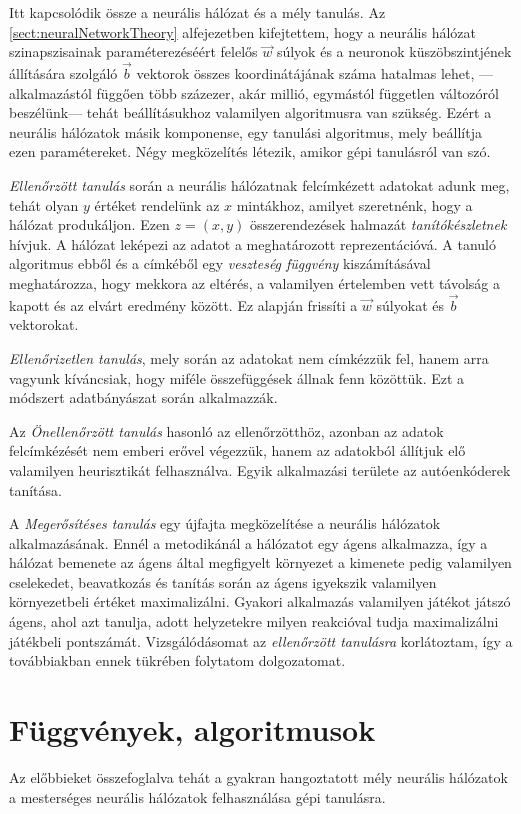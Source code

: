 Itt kapcsolódik össze a neurális hálózat és a mély tanulás. Az \ref{sect:neuralNetworkTheory} alfejezetben kifejtettem, hogy a neurális hálózat szinapszisainak paraméterezéséért felelős $\vec{w}$ súlyok és a neuronok küszöbszintjének állítására szolgáló $\vec{b}$ vektorok összes koordinátájának száma hatalmas lehet, ---alkalmazástól függően több százezer, akár millió, egymástól független változóról beszélünk--- tehát beállításukhoz valamilyen algoritmusra van szükség. Ezért a neurális hálózatok másik komponense, egy tanulási algoritmus, mely beállítja ezen paramétereket. Négy  megközelítés létezik, amikor gépi tanulásról van szó.

\emph{Ellenőrzött tanulás} során a neurális hálózatnak felcímkézett adatokat adunk meg, tehát olyan $y$ értéket  rendelünk az $x$ mintákhoz, amilyet szeretnénk, hogy a hálózat produkáljon. Ezen $z=(x,y)$ összerendezések halmazát \emph{tanítókészletnek} hívjuk. A hálózat leképezi az adatot a meghatározott reprezentációvá. A tanuló algoritmus ebből és a címkéből egy \emph{veszteség függvény} kiszámításával meghatározza, hogy mekkora az eltérés, a valamilyen értelemben vett távolság a kapott és az elvárt eredmény között. Ez alapján frissíti a $\vec{w}$ súlyokat és $\vec{b}$ vektorokat.

\emph{Ellenőrizetlen tanulás}, mely során az adatokat nem címkézzük fel, hanem arra vagyunk kíváncsiak, hogy miféle összefüggések állnak fenn közöttük. Ezt a módszert adatbányászat során alkalmazzák. 

Az \emph{Önellenőrzött tanulás} hasonló az ellenőrzötthöz, azonban az adatok felcímkézését nem emberi erővel végezzük, hanem az adatokból állítjuk elő valamilyen heurisztikát felhasználva. Egyik alkalmazási területe az autóenkóderek tanítása.

A \emph{Megerősítéses tanulás} egy újfajta megközelítése a neurális hálózatok alkalmazásának. Ennél a metodikánál a hálózatot egy ágens alkalmazza, így a hálózat bemenete az ágens által megfigyelt környezet a kimenete pedig valamilyen cselekedet, beavatkozás és tanítás során az ágens igyekszik valamilyen környezetbeli értéket maximalizálni. Gyakori alkalmazás valamilyen játékot játszó ágens, ahol azt tanulja, adott helyzetekre milyen reakcióval tudja maximalizálni játékbeli pontszámát.
Vizsgálódásomat az \emph{ellenőrzött tanulásra} korlátoztam, így a továbbiakban ennek tükrében folytatom dolgozatomat.

\section{Függvények, algoritmusok}\label{sec:fuggvenyek-algoritmusok}
Az előbbieket összefoglalva tehát a gyakran hangoztatott mély neurális hálózatok a mesterséges neurális hálózatok felhasználása gépi tanulásra.


